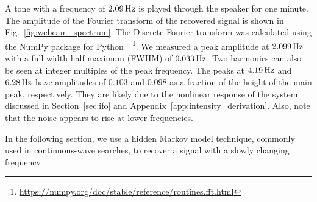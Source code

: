 \documentclass[paper-main.tex]{subfiles}
\begin{document}
A tone with a frequency of $2.09\,{\rm Hz}$ is played through the speaker for one minute. 
The amplitude of the Fourier transform of the recovered signal is shown in Fig.~\ref{fig:webcam_spectrum}. The Discrete Fourier transform was calculated using the NumPy package for Python~\cite{numpy}~\footnote{\url{https://numpy.org/doc/stable/reference/routines.fft.html}}.
We measured a peak amplitude at $2.099\,{\rm Hz}$ with a full width half maximum (FWHM) of $0.033\,{\rm Hz}$.
Two harmonics can also be seen at integer multiples of the peak frequency. 
The peaks at $4.19\,{\rm Hz}$ and $6.28\,{\rm Hz}$ have amplitudes of $0.103$ and $0.098$ as a fraction of the height of the main peak, respectively. They are likely due to the nonlinear response of the system discussed in Section~\ref{sec:ifo} and Appendix~\ref{app:intensity_derivation}. Also, note that the noise appears to rise at lower frequencies.


In the following section, we use a hidden Markov model technique, commonly used in continuous-wave searches, to recover a signal with a slowly changing frequency.
\end{document}
